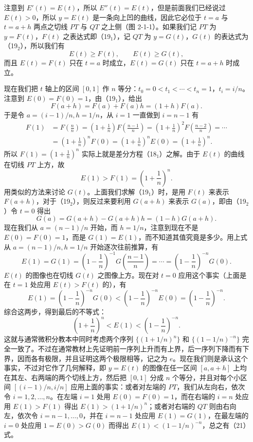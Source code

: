 注意到 $E'(t)=E(t)$，所以 $E''(t)=E(t)$，但是前面我们已经说过 $E(t)>0$，所以 $y=E(t)$ 是一条向上凹的曲线，因此它必位于 $t=a$ 与 $t=a+h$ 两点之切线 $PT$ 与 $QT$ 之上侧（图 2-1-1）。如果我们记 $PT$ 为 $y=F(t)$，$F(t)$ 之表达式即（19$_1$），记 $QT$ 为 $y=G(t)$，$G(t)$ 的表达式为（19$_2$），所以我们有
\[
E(t)\ge F(t),\qquad E(t)\ge G(t), \tag{20}
\]
而且 $E(t)=F(t)$ 只在 $t=a$ 时成立，$E(t)=G(t)$ 只在 $t=a+h$ 时成立。

现在我们把 $t$ 轴上的区间 $[0,1]$ 作 $n$ 等分：$t_0=0<t_1<\cdots<t_n=1$，$t_i=i/n$。注意到 $E(0)=F(0)=1$，由（19$_1$），给出
\[
F(a+h)=F(a)+F(a)h=(1+h)F(a).
\]
于是令 $a=(i-1)/n,h=1/n$，从 $i=1$ 一直做到 $i=n-1$ 有
\[
\begin{aligned}
F(1)&=F\left(\frac nn\right)
=\left(1+\frac1n\right)F\left(\frac{n-1}{n}\right)
=\left(1+\frac1n\right)^2F\left(\frac{n-2}{n}\right)=\cdots\\
&=\left(1+\frac1n\right)^nF(0)
=\left(1+\frac1n\right)^nE(0)
=\left(1+\frac1n\right)^n.
\end{aligned}
\]
所以 $F(1)=\left(1+\frac1n\right)^n$ 实际上就是差分方程（18$_1$）之解。由于 $E(t)$ 的曲线在切线 $PT$ 上方，故
\[
E(1)>F(1)=\left(1+\frac1n\right)^n.
\]
用类似的方法来讨论 $G(t)$。上面我们求解（19$_1$）时，是用 $F(t)$ 来表示 $F(a+h)$，对于（19$_2$），则反过来要利用 $G(a+h)$ 来表示 $G(a)$，即由（19$_2$）令 $t=0$ 得出
\[
G(a)=G(a+h)-G(a+h)h=(1-h)G(a+h).
\]
现在我们从 $a=(n-1)/n$ 开始，而 $h=1/n$，注意到现在不是 $E(0)=F(0)=1$，而是 $G(1)=E(1)$，而不知道其值究竟是多少。用上式从 $a=(n-1)/n,h=1/n$ 开始逐次往前推算，有
\[
E(1)=G(1)=\left(1-\frac1n\right)^{-1}G\left(\frac{n-1}{n}\right)=\cdots=\left(1-\frac1n\right)^{-n}G(0).
\]
$E(t)$ 的图像也在切线 $G(t)$ 之图像上方。现在对 $t=0$ 应用这个事实（上面是在 $t=1$ 处应用 $E(t)>F(t)$ 的），有
\[
E(1)=\left(1-\frac1n\right)^{-n}G(0)<\left(1-\frac1n\right)^{-n}E(0)=\left(1-\frac1n\right)^{-n}.
\]
综合这两步，得到最后的不等式：
\[
\left(1+\frac1n\right)^n<E(1)<\left(1-\frac1n\right)^{-n}. \tag{21}
\]
这就与通常微积分教本中同时考虑两个序列 $\{(1+1/n)^n\}$ 和 $\{(1-1/n)^{-n}\}$ 完全一致了。不过在通常教材上先证明前一序列上升而有上界，后一序列下降而有下界，因而各有极限，并且证明这两个极限相等，记之为 $e$。现在我们则是承认这个事实，不过对它作了几何解释，即 $y=E(t)$ 的图像在任一区间 $[a,a+h]$ 上均在其左、右两端的两个切线上方，然后把 $[0,1]$ 分成 $n$ 个等分，并且对每个小区间 $[(i-1)/n,i/n]$ 应用上面的事实：或者对左端的 $PT$，我们从左向右，依次令 $i=1,2,\ldots,n$。在左端 $i=1$ 处用 $E(0)=F(0)=1$，而在右端的 $i=n$ 处应用 $E(1)>F(1)$ 得出 $E(1)>\left(1+1/n\right)^n$；或者对右端的 $QT$ 则由右向左，依次令 $i=n-1,\ldots,0$，并在 $i=n-1$ 处应用 $E(1)=G(1)$，在最左端的 $i=0$ 处应用 $1=E(0)>G(0)$ 而得出 $E(1)<\left(1-1/n\right)^{-n}$，总之有（21）式。


